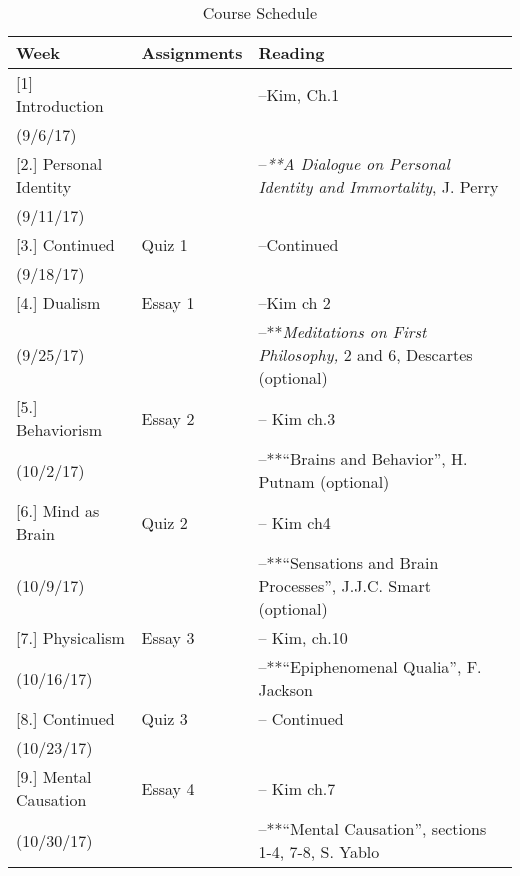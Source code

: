 \documentclass[article,oneside]{memoir}
\begin{document}
\begin{center}
\begin{longtable}{p{4.5cm}p{2cm}p{6cm}}
 
  \caption{Course Schedule} \\
  \toprule
  \textbf{Week} &\textbf{Assignments} & \textbf{Reading} \\
  \midrule


[1] Introduction		  		& 	 			& --Kim, Ch.1  \\
(9/6/17)					&		  		&    \\ [1.8\baselineskip]

[2.] Personal Identity			& 				& --\emph{**A Dialogue on Personal Identity and Immortality}, J. Perry   \\
(9/11/17)			        		&			  	&   \\  [1.8\baselineskip]

[3.] Continued			    	& Quiz 1    		& --Continued  \\
(9/18/17)				         &		  	    	&   \\  [1.8\baselineskip]
	
[4.] Dualism			      	& Essay 1			& --Kim ch 2 \\
(9/25/17)				        	& 			    	& --**\emph{Meditations on First Philosophy,} 2 and 6,  Descartes (optional) \\ [1.8\baselineskip]

[5.] Behaviorism		    	& Essay 2   	& --  Kim ch.3 \\
(10/2/17)			        		&		    	  	& --**``Brains and Behavior'', H. Putnam (optional) \\ [1.8\baselineskip]
  
[6.] Mind as Brain 		   	& Quiz 2	   	&  --  Kim ch4\\
(10/9/17)				         & 			    	& --**``Sensations and Brain Processes'', J.J.C. Smart (optional)\\  [1.8\baselineskip]		

[7.] Physicalism		     		& Essay 3			& -- Kim, ch.10 \\ 
(10/16/17)				      	&			      	& --**``Epiphenomenal Qualia'', F. Jackson \\ [1.8\baselineskip]
						
[8.] Continued 	      			& Quiz 3			&  -- Continued \\
(10/23/17)				      	&			      	&  \\  [1.8\baselineskip]

[9.] Mental Causation 		& Essay 4			& -- Kim ch.7 \\
(10/30/17)				      	&	      			& --**``Mental Causation'', sections 1-4, 7-8, S. Yablo  \\  [1.8\baselineskip]


\end{longtable}
\end{center}
\end{document}
